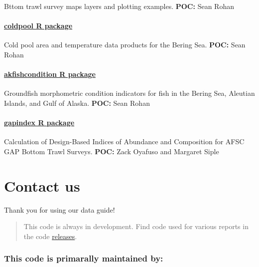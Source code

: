\documentclass[
  letterpaper,
  oneside,
  open=any]{scrbook}
\begin{document}
Bttom trawl survey maps layers and plotting examples. \textbf{POC:} Sean
Rohan

\subsection{\texorpdfstring{\href{https://github.com/afsc-gap-products/coldpool}{coldpool
R package}}{coldpool R package}}\label{coldpool-r-package}

Cold pool area and temperature data products for the Bering Sea.
\textbf{POC:} Sean Rohan

\subsection{\texorpdfstring{\href{https://github.com/afsc-gap-products/akfishcondition}{akfishcondition
R package}}{akfishcondition R package}}\label{akfishcondition-r-package}

Groundfish morphometric condition indicators for fish in the Bering Sea,
Aleutian Islands, and Gulf of Alaska. \textbf{POC:} Sean Rohan

\subsection{\texorpdfstring{\href{https://github.com/afsc-gap-products/gapindex}{gapindex
R package}}{gapindex R package}}\label{gapindex-r-package}

Calculation of Design-Based Indices of Abundance and Composition for
AFSC GAP Bottom Trawl Surveys. \textbf{POC:} Zack Oyafuso and Margaret
Siple

\part{Contact us}

Thank you for using our data guide!

\begin{quote}
This code is always in development. Find code used for various reports
in the code
\href{https://github.com/IEA-Data/IEA_Data_Guidance_Doc//releases}{releases}.
\end{quote}

\section*{This code is primarally maintained
by:}\label{this-code-is-primarally-maintained-by}
\end{document}
